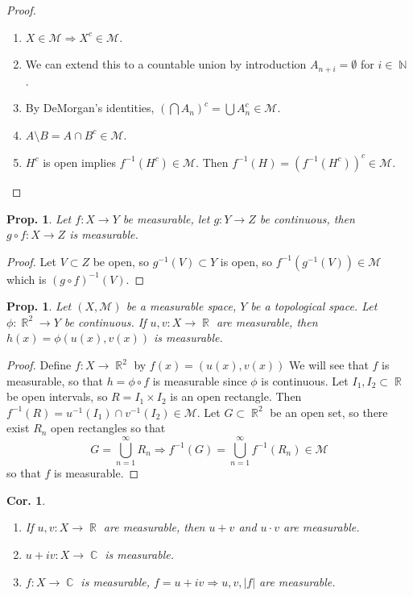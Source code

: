 \documentclass[12pt, a4paper]{book}
\DeclareMathOperator{\N}{\mathbb{N}}
\DeclareMathOperator{\R}{\mathbb{R}}
\DeclareMathOperator{\C}{\mathbb{C}}
\newtheorem{corollary}[theorem]{Cor.}
\newtheorem{proposition}[theorem]{Prop.}
\theoremstyle{nonumberplain}
\newtheorem{proof}{Proof}
\begin{document}
\begin{proof}
    \begin{enumerate}[nolistsep]
        \item $X\in\mathcal{M}\Rightarrow X^c\in\mathcal{M}$.
        \item We can extend this to a countable union by introduction $A_{n+i}=\emptyset$ for $i\in\N$.
        \item By DeMorgan's identities, $(\bigcap A_n)^c=\bigcup A_n^c\in\mathcal{M}$.
        \item $A\setminus B=A\cap B^c\in\mathcal{M}$.
        \item $H^c$ is open implies $f^{-1}(H^c)\in\mathcal{M}$.
            Then $f^{-1}(H)=(f^{-1}(H^c))^c\in\mathcal{M}$.
    \end{enumerate}
\end{proof}
\begin{proposition}
    Let $f:X\to Y$ be measurable, let $g:Y\to Z$ be continuous, then $g\circ f:X\to Z$ is measurable.
\end{proposition}
\begin{proof}
    Let $V\subset Z$ be open, so $g^{-1}(V)\subset Y$ is open, so $f^{-1}(g^{-1}(V))\in\mathcal{M}$ which is $(g\circ f)^{-1}(V)$.
\end{proof}
\begin{proposition}
    Let $(X,\mathcal{M})$ be a measurable space, $Y$ be a topological space.
    Let $\phi:\R^2\to Y$ be continuous.
    If $u,v:X\to\R$ are measurable, then $h(x)=\phi(u(x),v(x))$ is measurable.
\end{proposition}
\begin{proof}
    Define $f:X\to\R^2$ by $f(x)=(u(x),v(x))$
    We will see that $f$ is measurable, so that $h=\phi\circ f$ is measurable since $\phi$ is continuous.
    Let $I_1,I_2\subset\R$ be open intervals, so $R=I_1\times I_2$ is an open rectangle.
    Then $f^{-1}(R)=u^{-1}(I_1)\cap v^{-1}(I_2)\in\mathcal{M}$.
    Let $G\subset\R^2$ be an open set, so there exist $R_n$ open rectangles so that
    \[G=\bigcup_{n=1}^\infty R_n\Rightarrow f^{-1}(G)=\bigcup\limits_{n=1}^\infty f^{-1}(R_n)\in\mathcal{M}\]
    so that $f$ is measurable.
\end{proof}
\begin{corollary}
    \begin{enumerate}[nolistsep]
        \item If $u,v:X\to\R$ are measurable, then $u+v$ and $u\cdot v$ are measurable.
        \item $u+iv:X\to\C$ is measurable.
        \item $f:X\to\C$ is measurable, $f=u+iv\Rightarrow u,v,|f|$ are measurable.
    \end{enumerate}
\end{corollary}
\end{document}
